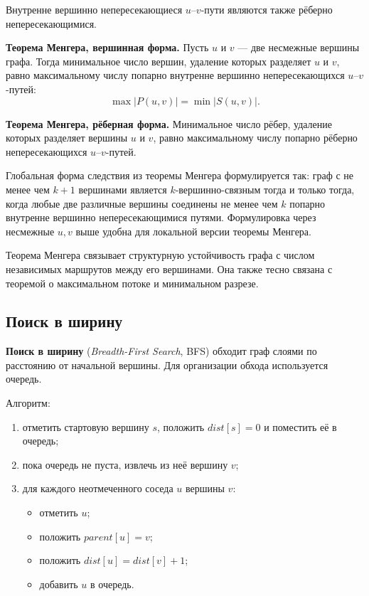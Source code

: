Внутренне вершинно непересекающиеся $u$--$v$-пути являются также рёберно непересекающимися.

\textbf{Теорема Менгера, вершинная форма.}
Пусть $u$ и $v$ --- две несмежные вершины графа. Тогда минимальное число вершин, удаление которых разделяет $u$ и $v$, равно максимальному числу попарно внутренне вершинно непересекающихся
$u$--$v$-путей:
\[
\max |P(u,v)|=\min |S(u,v)|.
\]

\textbf{Теорема Менгера, рёберная форма.}
Минимальное число рёбер, удаление которых разделяет вершины $u$ и $v$, равно максимальному числу попарно рёберно непересекающихся
$u$--$v$-путей.

Глобальная форма следствия из теоремы Менгера формулируется так: граф с не менее
чем $k+1$ вершинами является $k$-вершинно-связным тогда и только тогда, когда
любые две различные вершины соединены не менее чем $k$ попарно внутренне
вершинно непересекающимися путями. Формулировка через несмежные $u,v$ выше
удобна для локальной версии теоремы Менгера.

Теорема Менгера связывает структурную устойчивость графа с числом независимых маршрутов между его вершинами. Она также тесно связана с теоремой о максимальном потоке и минимальном разрезе.

\subsection{Поиск в ширину}

\textbf{Поиск в ширину} (\textit{Breadth-First Search}, BFS) обходит граф слоями по расстоянию от начальной вершины. Для организации обхода используется очередь.

Алгоритм:
\begin{enumerate}
	\item отметить стартовую вершину $s$, положить $dist[s]=0$ и поместить её в очередь;
	\item пока очередь не пуста, извлечь из неё вершину $v$;
	\item для каждого неотмеченного соседа $u$ вершины $v$:
	\begin{itemize}
		\item отметить $u$;
		\item положить $parent[u]=v$;
		\item положить $dist[u]=dist[v]+1$;
		\item добавить $u$ в очередь.
	\end{itemize}
\end{enumerate}

